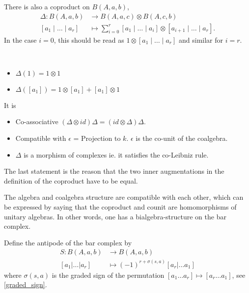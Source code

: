\begin{defn}
There is also a coproduct on $B(A, a, b)$,
\begin{align*}
  \Delta : B(A,a,b) &\to B(A,a,c) \otimes B(A,c,b) \\
  [a_1 \mid \ldots \mid a_r] &\mapsto \sum_{i=0}^r [a_1 \mid \ldots \mid a_i] \otimes [a_{i+1} \mid \ldots \mid a_r].
\end{align*}
In the case $i=0$, this should be read as $1 \otimes [a_1 \mid \ldots \mid a_r]$ and similar for $i=r$. 
\end{defn}
%
\begin{exam} \ 
\begin{itemize}
\item $\Delta(1)      = 1 \otimes 1 $
\item $\Delta([a_1])  = 1 \otimes [a_1] + [a_1] \otimes 1 $
\end{itemize}
\end{exam}
%
%
It is
\begin{itemize}
\item Co-associative $(\Delta \otimes id) \Delta = (id \otimes \Delta) \Delta$.
\item Compatible with $\epsilon $ = Projection to $k$. $\epsilon$ is the co-unit of the coalgebra. 
\item $\Delta$ is a morphism of complexes ie. it satisfies the co-Leibniz rule.
\end{itemize}

\begin{rem}
The last statement is the reason that the two inner augmentations in the definition of the coproduct have to be equal.
\end{rem}

The algebra and coalgebra structure are compatible with each other, which can be expressed by saying that the coproduct and counit are homomorphisms of unitary algebras. 
In other words, one has a bialgebra-structure on the bar complex. 

\begin{defn} Define the antipode of the bar complex by 
\begin{align*}
S : B(A,a,b) &\to B(A,a,b) \\
[a_1|\ldots |a_r] &\mapsto (-1)^{r+\sigma(s,a)} [a_r | \ldots a_1] 
\end{align*}
where $\sigma(s,a)$ is the graded sign of the permutation $[a_1 \ldots a_r] \mapsto [a_r \ldots a_1]$, see \ref{graded_sign}.
\end{defn}

